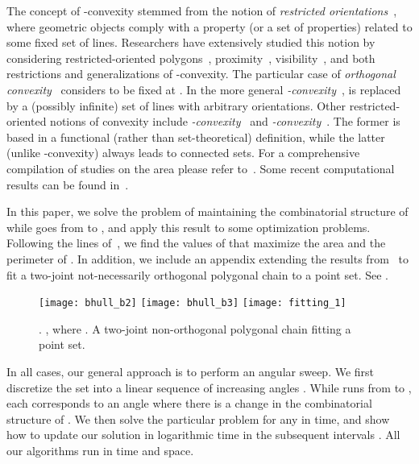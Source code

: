 \documentclass[11pt,letterpaper,english]{article}
\theoremstyle{definition}
\begin{document}
The concept of -convexity stemmed from the notion of
\emph{restricted orientations}~\cite{guting_thesis_1983}, where
geometric objects comply with a property (or a set of properties)
related to some fixed set of lines. Researchers have extensively
studied this notion by considering restricted-oriented
polygons~\cite{guting_thesis_1983}, proximity~\cite{widmayer_1987},
visibility~\cite{schuierer_thesis_1991}, and both restrictions and
generalizations of -convexity. The particular case of
\emph{orthogonal convexity}~\cite{rawlins_1988} considers  to
be fixed at . In the more general
\emph{-convexity}~\cite{rawlins_1987,rawlins_1988},
 is replaced by a (possibly infinite) set of lines with
arbitrary orientations. Other restricted-oriented notions of convexity
include \emph{-convexity}~\cite{franek_2009} and
\emph{-convexity}~\cite{rawlins_thesis_1987}. The former
is based in a functional (rather than set-theoretical) definition,
while the latter (unlike -convexity) always leads to connected
sets. For a comprehensive compilation of studies on the area please
refer to~\citet{fink_2004}. Some recent computational results can be
found in~\cite{minimum-area_2012,alegria_2013,alegria_2014,pelaez_2013}.

In this paper, we solve the problem of maintaining the combinatorial structure
of  while  goes from  to , and apply
this result to some optimization problems. Following the lines
of~\citet{bae_2009}, we find the values of  that maximize the
area and the perimeter of . In addition, we include an appendix extending the results
from~\citet{fitting_2011} to fit a two-joint not-necessarily orthogonal polygonal
chain to a point set. See .

\begin{figure}[ht]
  \centering
  \subcaptionbox{\label{bhull:fig:optim:1}}
  {\texttt{[image: bhull\_b2]}}
\hspace{-0.2cm}
  \subcaptionbox{\label{bhull:fig:optim:2}}
  {\texttt{[image: bhull\_b3]}}
\hspace{-0.4cm}
  \subcaptionbox{\label{bhull:fig:optim:3}}
  {\texttt{[image: fitting\_1]}}
  \caption{
    . 
    , where .
     A two-joint non-orthogonal polygonal
    chain fitting a point set.}
  \label{intro:fig:optim}
\end{figure}

In all cases, our general approach is to perform an angular sweep. We
first discretize the set  into a linear
sequence of increasing angles
. While  runs from
 to , each  corresponds to an angle where there is a
change in the combinatorial structure of . We then solve the
particular problem for any  in
 time, and show how to update our solution in logarithmic time in the
subsequent intervals . All our algorithms run
in  time and  space.
\end{document}
